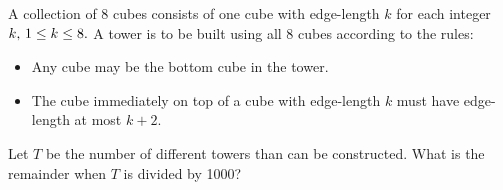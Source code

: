 A collection of 8 cubes consists of one cube with edge-length $k$ for each integer $k,\thinspace 1 \le k \le 8.$  A tower is to be built using all 8 cubes according to the rules:

\begin{itemize}
	\item Any cube may be the bottom cube in the tower.
	\item The cube immediately on top of a cube with edge-length $k$ must have edge-length at most $k+2$.
\end{itemize}

Let $T$ be the number of different towers than can be constructed.  What is the remainder when $T$ is divided by 1000?
